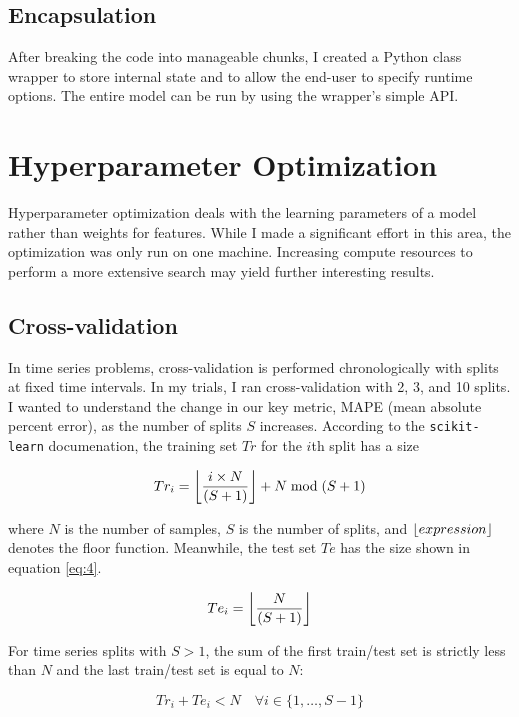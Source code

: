 \documentclass[11pt, oneside]{report}
\DeclarePairedDelimiter{\floor}{\lfloor}{\rfloor}
\begin{document}
\subsection{Encapsulation}
After breaking the code into manageable chunks, I created a Python class wrapper to store internal state and to allow the end-user to specify runtime options. The entire model can be run by using the wrapper's simple API.

\section{Hyperparameter Optimization}
Hyperparameter optimization deals with the learning parameters of a model rather than weights for features. While I made a significant effort in this area, the optimization was only run on one machine. Increasing compute resources to perform a more extensive search may yield further interesting results.

\subsection{Cross-validation}
\label{cross_validation}
In time series problems, cross-validation is performed chronologically with splits at fixed time intervals. In my trials, I ran cross-validation with 2, 3, and 10 splits. I wanted to understand the change in our key metric, MAPE (mean absolute percent error), as the number of splits $S$ increases. According to the \texttt{scikit-learn} documenation, the training set $Tr$ for the $i$th split has a size

\begin{equation}
  \label{eq:3}
  Tr_{i} = \floor*{\frac{i \times N}{(S + 1)}} + N \bmod (S + 1)
\end{equation}

where $N$ is the number of samples, $S$ is the number of splits, and $\floor{expression}$ denotes the floor function. Meanwhile, the test set $Te$ has the size shown in equation \ref{eq:4}.

\begin{equation}
  \label{eq:4}
  Te_{i} = \floor*{\frac{N}{(S + 1)}}
\end{equation}

For time series splits with $S>1$, the sum of the first train/test set is strictly less than $N$ and the last train/test set is equal to $N$:

\begin{equation}
  \label{eq:5}
  Tr_{i} + Te_{i} < N \quad \forall i \in \{1, \dots, S-1\}
\end{equation}
\end{document}
